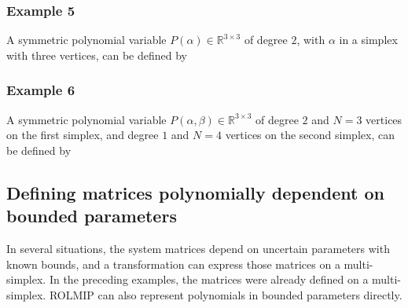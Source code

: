 \documentclass[english,11pt]{article}
\theoremstyle{break} \theorembodyfont{\small\rm}
\begin{document}


\subsubsection*{Example 5}
A symmetric polynomial variable $P(\alpha) \in \mathbb{R}^{3 \times 3}$ of degree
$2$, with $\alpha$ in a simplex with three vertices, can be defined by

\vspace{0.5cm}%
\noindent\begin{minipage}{\linewidth}
\end{minipage}
\vspace{0.2cm}


\subsubsection*{Example 6}
A symmetric polynomial variable $P(\alpha,\beta) \in \mathbb{R}^{3 \times 3}$ of degree
$2$ and $N=3$ vertices on the first simplex, and degree $1$ and $N=4$ vertices on
the second simplex, can be defined by

\vspace{0.5cm}%
\noindent\begin{minipage}{\linewidth}
\end{minipage}
\vspace{0.2cm}

\subsection{Defining matrices polynomially dependent on bounded parameters}

In several situations, the system matrices depend on uncertain parameters with known bounds,
and a transformation can express those matrices on a multi-simplex.
In the preceding examples, the matrices were already defined on a
multi-simplex. ROLMIP can also represent polynomials in bounded parameters
directly.
\end{document}
